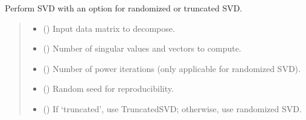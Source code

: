 \documentclass[letterpaper,10pt,english]{sphinxmanual}
\begin{document}
\begin{fulllineitems}
\label{\detokenize{core:pyALRA.core.randomized_svd_py}}
\pysigstartsignatures
\pysiglinewithargsret
{}
{\sphinxparamcomma {}\sphinxparamcomma {}\sphinxparamcomma {}\sphinxparamcomma {}}
{}
\pysigstopsignatures
\sphinxAtStartPar
Perform SVD with an option for randomized or truncated SVD.
\begin{quote}\begin{description}
\begin{itemize}
\item {} 
\sphinxAtStartPar
{} () \textendash{} Input data matrix to decompose.

\item {} 
\sphinxAtStartPar
{} () \textendash{} Number of singular values and vectors to compute.

\item {} 
\sphinxAtStartPar
{} () \textendash{} Number of power iterations (only applicable for randomized SVD).

\item {} 
\sphinxAtStartPar
{} () \textendash{} Random seed for reproducibility.

\item {} 
\sphinxAtStartPar
{} (\sphinxstyleliteralemphasis{\sphinxupquote{, }}) \textendash{} If ‘truncated’, use TruncatedSVD; otherwise, use randomized SVD.

\end{itemize}


\end{description}
\end{quote}
\end{fulllineitems}
\end{document}
